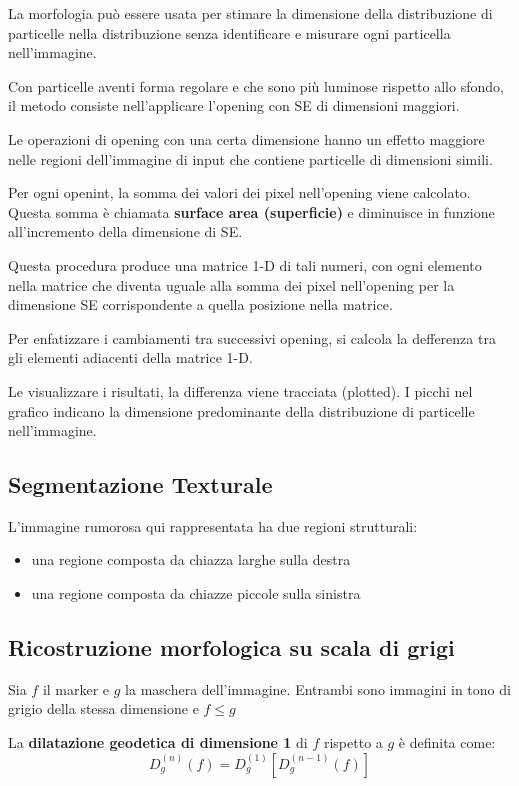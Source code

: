La morfologia può essere usata per stimare la dimensione della distribuzione di particelle nella distribuzione senza identificare e misurare ogni particella nell'immagine.

Con particelle aventi forma regolare e che sono più luminose rispetto allo sfondo, il metodo consiste nell'applicare l'opening con SE di dimensioni maggiori.

Le operazioni di opening con una certa dimensione hanno un effetto maggiore nelle regioni dell'immagine di input che contiene particelle di dimensioni simili.

Per ogni openint, la somma dei valori dei pixel nell'opening viene calcolato. Questa somma è chiamata \textbf{surface area (superficie)} e diminuisce in funzione all'incremento della dimensione di SE.

Questa procedura produce una matrice 1-D di tali numeri, con ogni elemento nella matrice che diventa uguale alla somma dei pixel nell'opening per la dimensione SE corrispondente a quella posizione nella matrice.

Per enfatizzare i cambiamenti tra successivi opening, si calcola la defferenza tra gli elementi adiacenti della matrice 1-D.

Le visualizzare i risultati, la differenza viene tracciata (plotted). I picchi nel grafico indicano la dimensione predominante della distribuzione di particelle nell'immagine.

\subsection{Segmentazione Texturale}
L'immagine rumorosa qui rappresentata ha due regioni strutturali:
\begin{itemize}
	\item una regione composta da chiazza larghe sulla destra
	\item una regione composta da chiazze piccole sulla sinistra
\end{itemize}

\subsection{Ricostruzione morfologica su scala di grigi}
Sia $f$ il marker e $g$ la maschera dell'immagine. Entrambi sono immagini in tono di grigio della stessa dimensione e $f \leq g$

La \textbf{dilatazione geodetica di dimensione 1} di $f$ rispetto a $g$ è definita come:
$$
D_{g}^{(n)}(f) = D_{g}^{(1)}[D_{g}^{(n-1)}(f)]
$$

